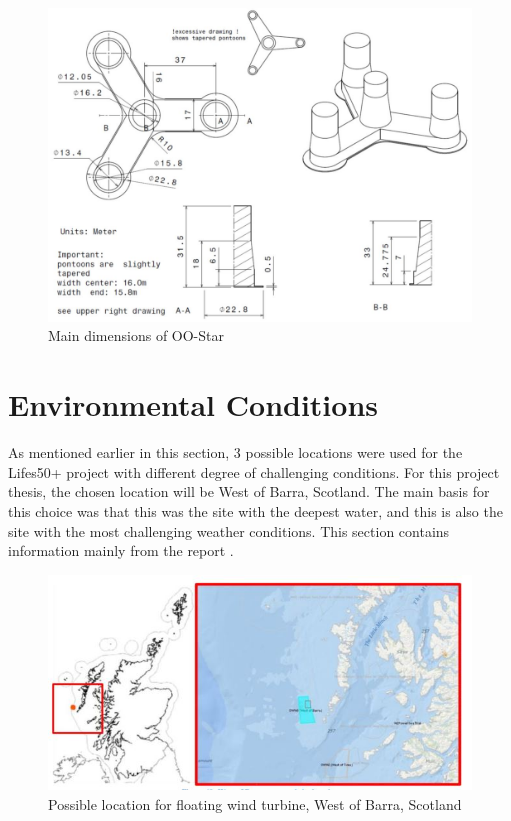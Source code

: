 \begin{figure}[H]
\centering
\includegraphics[scale=0.6]{figures/designoostar}
\caption[$\; \:$Main dimensions of OO-Star]{Main dimensions of OO-Star \cite{Lifes50+D4.2} }
 \label{fig:designoostar}
\end{figure}

\section{Environmental Conditions}
As mentioned earlier in this section, 3 possible locations were used for the Lifes50+ project with different degree of challenging conditions. For this project thesis, the chosen location will be West of Barra, Scotland. The main basis for this choice was that this was the site with the deepest water, and this is also the site with the most challenging weather conditions. This section contains information mainly from the report \cite{Lifes50+D1.1}.


\begin{figure}[H]
\centering
\includegraphics[scale=0.8]{figures/wob}
\caption[$\; \:$West of Barra, Scotland]{Possible location for floating wind turbine, West of Barra, Scotland \cite{Lifes50+D1.1} }
 \label{fig:wob}
\end{figure}

